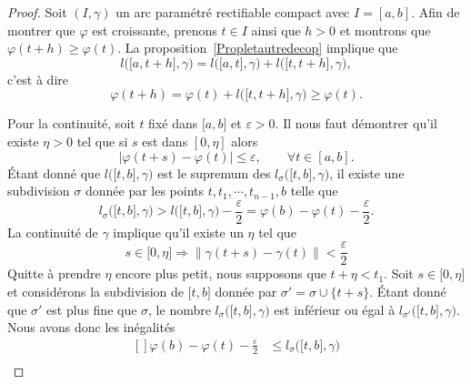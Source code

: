 \begin{proof}
    Soit $(I,\gamma)$ un arc paramétré rectifiable compact avec $I=[a,b]$. Afin de montrer que $\varphi$ est croissante, prenons $t\in I$ ainsi que $h>0$ et montrons que $\varphi(t+h)\geq \varphi(t)$. La proposition~\ref{Propletautredecop} implique que
    \begin{equation}
        l\big( \mathopen[ a , t+h \mathclose],\gamma \big)=l\big( \mathopen[ a ,t  \mathclose],\gamma \big)+l\big( \mathopen[ t , t+h \mathclose],\gamma \big),
    \end{equation}
    c'est à dire
    \begin{equation}
        \varphi(t+h)=\varphi(t)+l\big( \mathopen[ t , t+h \mathclose],\gamma \big)\geq \varphi(t).
    \end{equation}

    Pour la continuité, soit $t$ fixé dans $\mathopen[ a , b \mathclose]$ et $\varepsilon>0$. Il nous faut démontrer qu'il existe $\eta>0$ tel que si $s$ est dans $[0,\eta]$ alors
\[
|\varphi(t+s)-\varphi(t)|\leq \varepsilon, \qquad \forall t \in [a,b].
\]
Étant donné que $l\big( \mathopen[ t , b \mathclose],\gamma \big)$ est le supremum des $l_{\sigma}\big( \mathopen[ t , b \mathclose],\gamma \big)$, il existe une subdivision $\sigma$ donnée par les points  $t,t_1,\cdots,t_{n-1},b$ telle que
    \begin{equation}
        l_{\sigma}\big( \mathopen[ t , b \mathclose],\gamma \big)>l\big( \mathopen[ t , b \mathclose],\gamma \big)-\frac{ \varepsilon }{2}=\varphi(b)-\varphi(t)-\frac{ \varepsilon }{2}.
    \end{equation}
    La continuité de $\gamma$ implique qu'il existe un $\eta$ tel que
    \begin{equation}
        s\in\mathopen[ 0 , \eta \mathclose]\Rightarrow\| \gamma(t+s)-\gamma(t) \|<\frac{ \varepsilon }{2}
    \end{equation}
    Quitte à prendre $\eta$ encore plus petit, nous supposons que $t+\eta<t_1$. Soit $s\in\mathopen[ 0 , \eta \mathclose]$ et considérons la subdivision de $\mathopen[ t , b \mathclose]$ donnée par $\sigma'=\sigma\cup\{ t+s \}$. Étant donné que $\sigma'$ est plus fine que $\sigma$, le nombre $l_{\sigma}\big( \mathopen[ t , b \mathclose],\gamma \big)$ est inférieur ou égal à $l_{\sigma'}\big( \mathopen[ t , b \mathclose],\gamma \big)$. Nous avons donc les inégalités
    \begin{equation}
        \begin{aligned}[]
            \varphi(b)-\varphi(t)-\frac{ \varepsilon }{2}&\leq l_{\sigma}\big( \mathopen[ t , b \mathclose],\gamma \big)\\

\end{aligned}
\end{equation}
\end{proof}
